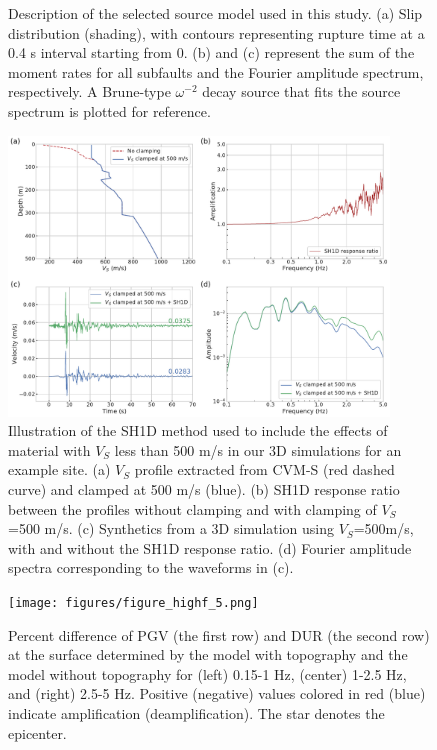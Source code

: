 \begin{figure}[!ht]
  \caption{Description of the selected source model used in this study. (a) Slip distribution (shading), with contours representing rupture time at a 0.4 s interval starting from 0. (b) and (c) represent the sum of the moment rates for all subfaults and the Fourier amplitude spectrum, respectively. A Brune-type  $\omega^{-2}$ decay source \citep{brune1970tectonic} that fits the source spectrum is plotted for reference.}
  \label{fig:highf-3}
\end{figure}
\clearpage


\begin{figure}[!ht]
  \centering
  \includegraphics[width=0.9\textwidth,height=0.9\textheight,keepaspectratio]{figures/figure_highf_4.pdf}
  \caption{Illustration of the SH1D method used to include the effects of material with $V_S$ less than 500 m/s in our 3D simulations for an example site. (a) $V_S$ profile extracted from CVM-S (red dashed curve) and clamped at 500 m/s (blue). (b) SH1D response ratio between the profiles without clamping and with clamping of $V_S$ =500 m/s. (c) Synthetics from a 3D simulation using $V_S$=500m/s, with and without the SH1D response ratio. (d) Fourier amplitude spectra corresponding to the waveforms in (c).}
  \label{fig:highf-4}
\end{figure}
\clearpage

\begin{figure}[!ht]
  \centering
  \texttt{[image: figures/figure\_highf\_5.png]}
  \caption{Percent difference of PGV (the first row) and DUR (the second row) at the surface determined by the model with topography and the model without topography for (left) 0.15-1 Hz, (center) 1-2.5 Hz, and (right) 2.5-5 Hz. Positive (negative) values colored in red (blue) indicate amplification (deamplification). The star denotes the epicenter.
  }
  \label{fig:highf-5}
\end{figure}
\clearpage

